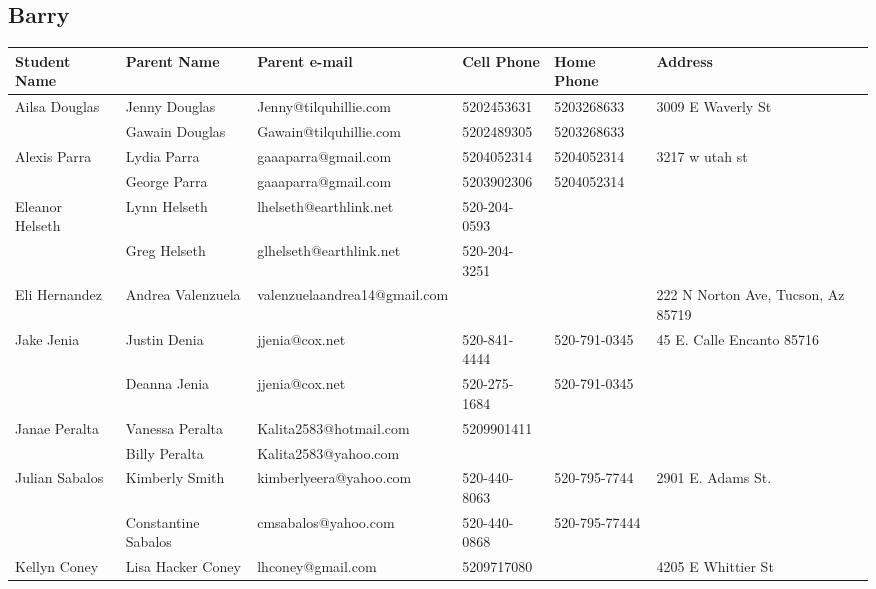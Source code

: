 \documentclass[landscape]{article}\usepackage[]{graphicx}\usepackage[]{color}
\begin{document}
\subsection{Barry}
\begin{longtable}{|p{100pt}|p{100pt}|p{140pt}|p{60pt}|p{64pt}|p{120pt}|}
\textbf{Student Name} & \textbf{Parent Name} & \textbf{Parent e-mail} & \textbf{Cell Phone} & \textbf{Home Phone} & \textbf{Address}\\
\hline
\hline
\multirow{2}{100pt}{Ailsa Douglas} & Jenny Douglas & Jenny@tilquhillie.com & 5202453631 & 5203268633 & \multirow{2}{120pt}{3009 E Waverly St} \\
 & Gawain Douglas & Gawain@tilquhillie.com & 5202489305 & 5203268633 & \\
\hline
\multirow{2}{100pt}{Alexis Parra} & Lydia Parra & gaaaparra@gmail.com & 5204052314 & 5204052314 & \multirow{2}{120pt}{3217 w utah st} \\
 & George Parra & gaaaparra@gmail.com & 5203902306 & 5204052314 & \\
\hline
\multirow{2}{100pt}{Eleanor Helseth} & Lynn Helseth & lhelseth@earthlink.net & 520-204-0593 &  & \multirow{2}{120pt}{} \\
 & Greg Helseth & glhelseth@earthlink.net & 520-204-3251 &  & \\
\hline
\multirow{2}{100pt}{Eli Hernandez} & Andrea Valenzuela & valenzuelaandrea14@gmail.com &  &  & \multirow{2}{120pt}{222 N Norton Ave, Tucson, Az 85719} \\
 &  &  &  &  & \\
\hline
\multirow{2}{100pt}{Jake Jenia} & Justin Denia & jjenia@cox.net & 520-841-4444 & 520-791-0345 & \multirow{2}{120pt}{45 E. Calle Encanto 85716} \\
 & Deanna Jenia & jjenia@cox.net & 520-275-1684 & 520-791-0345 & \\
\hline
\multirow{2}{100pt}{Janae Peralta} & Vanessa Peralta  & Kalita2583@hotmail.com & 5209901411 &  & \multirow{2}{120pt}{} \\
 & Billy Peralta & Kalita2583@yahoo.com &  &  & \\
\hline
\multirow{2}{100pt}{Julian Sabalos} & Kimberly Smith & kimberlyeera@yahoo.com & 520-440-8063 & 520-795-7744 & \multirow{2}{120pt}{2901 E. Adams St.} \\
 & Constantine Sabalos & cmsabalos@yahoo.com & 520-440-0868 & 520-795-77444 & \\
\hline
\multirow{2}{100pt}{Kellyn Coney} & Lisa Hacker Coney & lhconey@gmail.com & 5209717080 &  & \multirow{2}{120pt}{4205 E Whittier St} \\

\end{longtable}
\end{document}
